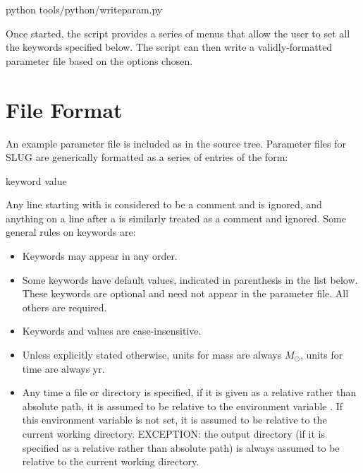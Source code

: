 \documentclass[letterpaper,10pt,english]{sphinxmanual}
\begin{document}
\begin{sphinxVerbatim}[commandchars=\\\{\}]
python tools/python/write\PYGZus{}param.py
\end{sphinxVerbatim}

Once started, the script provides a series of menus that allow the user to set all the keywords specified below. The script can then write a validly-formatted parameter file based on the options chosen.


\section{File Format}
\label{\detokenize{parameters:file-format}}
An example parameter file is included as  in the source tree. Parameter files for SLUG are generically formatted as a series of entries of the form:

\begin{sphinxVerbatim}[commandchars=\\\{\}]
keyword    value
\end{sphinxVerbatim}

Any line starting with \sphinxcode{\#} is considered to be a comment and is ignored, and anything on a line after a \sphinxcode{\#} is similarly treated as a comment and ignored. Some general rules on keywords are:
\begin{itemize}
\item {} 
Keywords may appear in any order.

\item {} 
Some keywords have default values, indicated in parenthesis in the list below. These keywords are optional and need not appear in the parameter file. All others are required.

\item {} 
Keywords and values are case-insensitive.

\item {} 
Unless explicitly stated otherwise, units for mass are always \(M_\odot\), units for time are always yr.

\item {} 
Any time a file or directory is specified, if it is given as a relative rather than absolute path, it is assumed to be relative to the environment variable . If this environment variable is not set, it is assumed to be relative to the current working directory. EXCEPTION: the output directory (if it is specified as a relative rather than absolute path) is always assumed to be relative to the current working directory.

\end{itemize}
\end{document}
